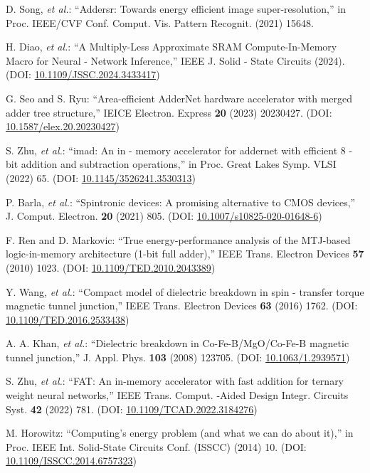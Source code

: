 \documentclass[submit]{elex2024}%
\begin{document}
\begin{thebibliography}{99}
D. Song, {\it et al.}: ``Addersr: Towards energy efficient image super-resolution,'' in Proc. IEEE/CVF Conf. Comput. Vis. Pattern Recognit. (2021) 15648.

H. Diao, {\it et al.}: ``A Multiply-Less Approximate SRAM Compute-In-Memory Macro for Neural - Network Inference,'' IEEE J. Solid - State Circuits (2024). (DOI: \href{https://doi.org/10.1109/JSSC.2024.3433417}{10.1109/JSSC.2024.3433417})

G. Seo and S. Ryu: ``Area-efficient AdderNet hardware accelerator with merged adder tree structure,'' IEICE Electron. Express {\bf 20} (2023) 20230427. (DOI: \href{https://doi.org/10.1587/elex.20.20230427}{10.1587/elex.20.20230427})

S. Zhu, {\it et al.}: ``imad: An in - memory accelerator for addernet with efficient 8 - bit addition and subtraction operations,'' in Proc. Great Lakes Symp. VLSI (2022) 65. (DOI: \href{https://doi.org/10.1145/3526241.3530313}{10.1145/3526241.3530313})

P. Barla, {\it et al.}: ``Spintronic devices: A promising alternative to CMOS devices,'' J. Comput. Electron. {\bf 20} (2021) 805. (DOI: \href{https://doi.org/10.1007/s10825-020-01648-6}{10.1007/s10825-020-01648-6})

F. Ren and D. Markovic: ``True energy-performance analysis of the MTJ-based logic-in-memory architecture (1-bit full adder),'' IEEE Trans. Electron Devices {\bf 57} (2010) 1023. (DOI: \href{https://doi.org/10.1109/TED.2010.2043389}{10.1109/TED.2010.2043389})

Y. Wang, {\it et al.}: ``Compact model of dielectric breakdown in spin - transfer torque magnetic tunnel junction,'' IEEE Trans. Electron Devices {\bf 63} (2016) 1762. (DOI: \href{https://doi.org/10.1109/TED.2016.2533438}{10.1109/TED.2016.2533438})

A. A. Khan, {\it et al.}: ``Dielectric breakdown in Co-Fe-B/MgO/Co-Fe-B magnetic tunnel junction,'' J. Appl. Phys. {\bf 103} (2008) 123705. (DOI: \href{https://doi.org/10.1063/1.2939571}{10.1063/1.2939571})

S. Zhu, {\it et al.}: ``FAT: An in-memory accelerator with fast addition for ternary weight neural networks,'' IEEE Trans. Comput. -Aided Design Integr. Circuits Syst. {\bf 42} (2022) 781. (DOI: \href{https://doi.org/10.1109/TCAD.2022.3184276}{10.1109/TCAD.2022.3184276})

M. Horowitz: ``Computing's energy problem (and what we can do about it),'' in Proc. IEEE Int. Solid-State Circuits Conf. (ISSCC) (2014) 10. (DOI: \href{https://doi.org/10.1109/ISSCC.2014.6757323}{10.1109/ISSCC.2014.6757323})


\end{thebibliography}
\end{document}
